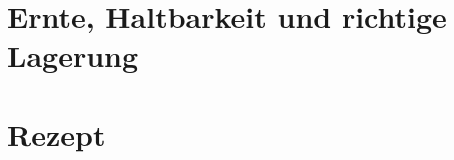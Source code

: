 \documentclass[a4paper,abstracton]{scrreprt}
\begin{document}
\section{Ernte, Haltbarkeit und richtige Lagerung}

\section{Rezept}

\printbibliography[heading=lit]
\end{document}
